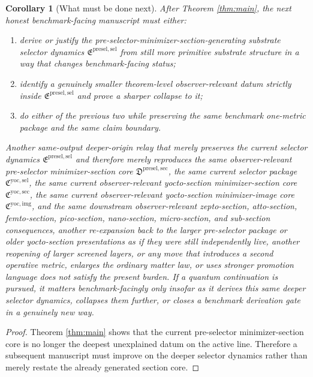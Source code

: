 \documentclass[11pt]{article}
\newcommand{\YoctoImageCore}{\mathfrak C^{\mathrm{yoc,img}}}
\newcommand{\YoctoMinSectionCore}{\mathfrak C^{\mathrm{yoc,sec}}}
\newcommand{\YoctoSelectorPackage}{\mathfrak C^{\mathrm{yoc,sel}}}
\newcommand{\PreSelectorMinSectionCore}{\mathfrak D^{\mathrm{presel,sec}}}
\newcommand{\PreSectionSelectorPackage}{\mathfrak E^{\mathrm{presel,sel}}}
\newtheorem{corollary}{Corollary}
\begin{document}
\begin{corollary}[What must be done next]
\label{cor:next}
After Theorem \ref{thm:main}, the next honest benchmark-facing manuscript must either:
\begin{enumerate}
    \item derive or justify the pre-selector-minimizer-section-generating substrate selector dynamics \(\PreSectionSelectorPackage\) from still more primitive substrate structure in a way that changes benchmark-facing status;
    \item identify a genuinely smaller theorem-level observer-relevant datum strictly inside \(\PreSectionSelectorPackage\) and prove a sharper collapse to it;
    \item do either of the previous two while preserving the same benchmark one-metric package and the same claim boundary.
\end{enumerate}
Another same-output deeper-origin relay that merely preserves the current selector dynamics \(\PreSectionSelectorPackage\) and therefore merely reproduces the same observer-relevant pre-selector minimizer-section core \(\PreSelectorMinSectionCore\), the same current selector package \(\YoctoSelectorPackage\), the same current observer-relevant yocto-section minimizer-section core \(\YoctoMinSectionCore\), the same current observer-relevant yocto-section minimizer-image core \(\YoctoImageCore\), and the same downstream observer-relevant zepto-section, atto-section, femto-section, pico-section, nano-section, micro-section, and sub-section consequences, another re-expansion back to the larger pre-selector package or older yocto-section presentations as if they were still independently live, another reopening of larger screened layers, or any move that introduces a second operative metric, enlarges the ordinary matter law, or uses stronger promotion language does not satisfy the present burden. If a quantum continuation is pursued, it matters benchmark-facingly only insofar as it derives this same deeper selector dynamics, collapses them further, or closes a benchmark derivation gate in a genuinely new way.
\end{corollary}

\begin{proof}
Theorem \ref{thm:main} shows that the current pre-selector minimizer-section core is no longer the deepest unexplained datum on the active line. Therefore a subsequent manuscript must improve on the deeper selector dynamics rather than merely restate the already generated section core.
\end{proof}
\end{document}
